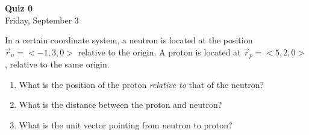 \documentclass{article}
\begin{document}
\fancyfoot[C]{\thepage}
\vspace*{0cm}
\begin{center}
	{\LARGE \textbf{Quiz 0}}\\
	\vspace{0.25cm}
	\vspace{0.25cm}
	{\Large Friday, September 3}
\end{center}

 In a certain coordinate system, a neutron is located at the position $\vec{r}_n=<-1,3,0>$ relative to the origin. A proton is located at $\vec{r}_p=<5,2,0>$, relative to the same origin.
\begin{enumerate}
	\item What is the position of the proton \textit{relative to} that of the neutron?
	\item What is the distance between the proton and neutron?
	\item What is the unit vector pointing from neutron to proton?
\end{enumerate}
\end{document}
